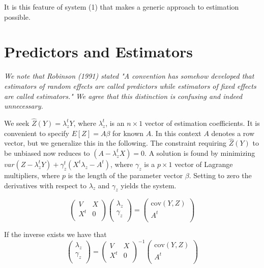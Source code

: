 \documentclass[12pt, a4paper]{article}
\begin{document}
It is this feature of system (1) that makes a generic approach to estimation possible.





\section{Predictors and Estimators}

\emph{We note that Robinson (1991) stated "A convention has somehow developed that estimators of random effects are called predictors while estimators of fixed effects are called estimators." We agree that this distinction is confusing and indeed unnecessary.} \\ \bigskip



We seek $\hat{Z}(Y) = \lambda_{z}^{t}Y$, where $ \lambda_{z}^{t}$, is an $n \times 1$ vector of estimation coefficients. It is convenient to specify $E[Z]=A\beta$ for known $A$. In this context $A$ denotes a row vector, but we generalize this in the following. The constraint requiring $\hat{Z}(Y)$ to be unbiased now reduces to $(A -  \lambda_{z}^{t}X) = 0$. A solution is found by minimizing $var(Z -  \lambda_{z}^{t}Y) + \gamma^t_z (X^t\lambda_{z} - A^t)$, where $\gamma_z$ is a $p \times 1$ vector of Lagrange multipliers, where $p$ is the length of the parameter vector $\beta$. Setting to zero the derivatives with respect to $\lambda_{z}$ and $\gamma_z $ yields the system.




\begin{equation}
\left(
\begin{array}{cc}
V & X \\
X^t & 0 \\
\end{array}
\right)\left(
\begin{array}{c}
\lambda_{z}\\
\gamma_z \\
\end{array}
\right)=\left(
\begin{array}{c}
\mbox{cov}(Y,Z)\\
A^{t} \\
\end{array}
\right)
\end{equation}


If the inverse exists we have that
\begin{equation}
\left(
\begin{array}{c}
\lambda_{z}\\
\gamma_z \\
\end{array}
\right)=\left(
\begin{array}{cc}
V & X \\
X^t & 0 \\
\end{array}
\right) ^{-1}\left(
\begin{array}{c}
\mbox{cov}(Y,Z)\\
A^{t} \\
\end{array}
\right)
\end{equation}
\end{document}
